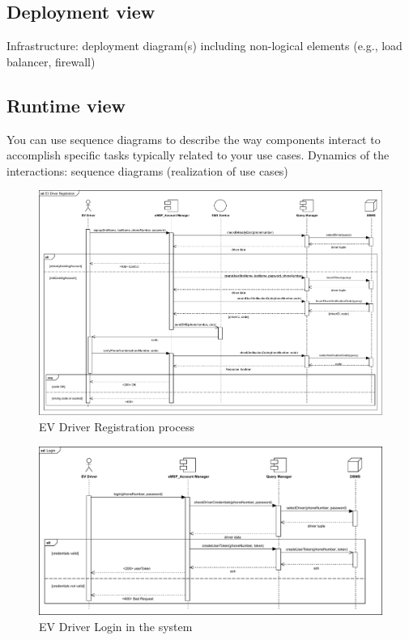 \subsection{Deployment view}
Infrastructure: deployment diagram(s) including non-logical elements (e.g., load balancer, firewall)

\subsection{Runtime view}
You can use sequence diagrams to describe the way components interact to accomplish specific tasks typically related to your use cases. Dynamics of the interactions: sequence
diagrams (realization of use cases)

\begin{figure}[H]
    \centering
    \includegraphics[scale=0.55]{src/runtimeVIew/DriverRegistration.pdf}
    \caption{EV Driver Registration process}
\end{figure}

\begin{figure}[H]
    \centering
    \includegraphics[scale=0.55]{src/runtimeVIew/DriverLogin.pdf}
    \caption{EV Driver Login in the system}
\end{figure}

